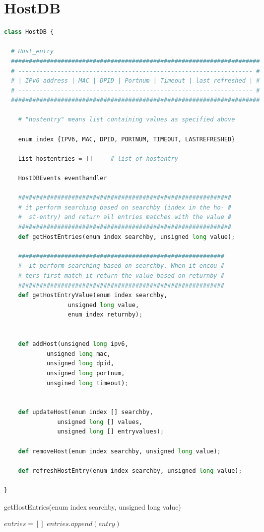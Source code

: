 \documentclass[10pt,a4paper,titlepage]{report}
\begin{document}
\section{HostDB}
\begin{lstlisting}[language=Python]
class HostDB {

  # Host_entry 
  ######################################################################
  # ------------------------------------------------------------------ #
  # | IPv6 address | MAC | DPID | Portnum | Timeout | last refreshed | #
  # ------------------------------------------------------------------ #
  ######################################################################

	# "hostentry" means list containing values as specified above
	
	enum index {IPV6, MAC, DPID, PORTNUM, TIMEOUT, LASTREFRESHED}

	List hostentries = []	  # list of hostentry
	
	HostDBEvents eventhandler
	
	############################################################
	# it perform searching based on searchby (index in the ho- #
	#  st-entry) and return all entries matches with the value #
	############################################################
	def getHostEntries(enum index searchby, unsigned long value);
	
	##########################################################
	#  it perform searching based on searchby. When it encou #
	# ters first match it return the value based on returnby #
	##########################################################
	def getHostEntryValue(enum index searchby, 
			      unsigned long value, 
			      enum index returnby);
	
	
	def addHost(unsigned long ipv6, 
		    unsigned long mac, 
		    unsigned long dpid, 
		    unsigned long portnum, 
		    unsgined long timeout);
	
	
	def updateHost(enum index [] searchby, 
		       unsigned long [] values, 
		       unsigned long [] entryvalues);
	
	def removeHost(enum index searchby, unsigned long value);
	
	def refreshHostEntry(enum index searchby, unsigned long value);
	
}
\end{lstlisting}

\begin{algorithm}
	\caption{getHostEntries(enum index searchby, unsigned long value)}
	\begin{algorithmic}[1]
		\STATE $entries = []$
				\STATE $entries.append(entry)$
			\ENDIF
		\ENDFOR
	\end{algorithmic}
\end{algorithm}
\end{document}
